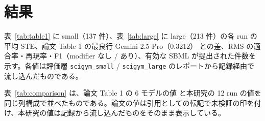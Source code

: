 \documentclass{article}
\providecommand{\unverified}[1]{#1}
\begin{document}

\section{結果}
\label{sec:results}
表~\ref{tab:table1} に small（137 件）、表~\ref{tab:large} に large（213 件）の各 run の平均 STE、論文 Table 1 の最良行 Gemini-2.5-Pro（\unverified{0.3212}）\cite[s1.p5]{duan-2025-measuring} との差、RMS の適合率・再現率・F1（modifier なし / あり）、有効な SBML が提出された件数を示す。各値は評価層 \texttt{scigym\_small} / \texttt{scigym\_large} のレポートから記録経由で流し込んだものである。

{\scriptsize\setlength{\tabcolsep}{2.5pt}}

{\scriptsize\setlength{\tabcolsep}{2.5pt}}

表~\ref{tab:comparison} は、論文 Table 1 の 6 モデルの値 \cite[s1.p5]{duan-2025-measuring} と本研究の 12 run の値を同じ列構成で並べたものである。論文の値は引用としての転記で未検証の印を付け、本研究の値は記録から流し込んだものをそのまま表示している。
\end{document}
